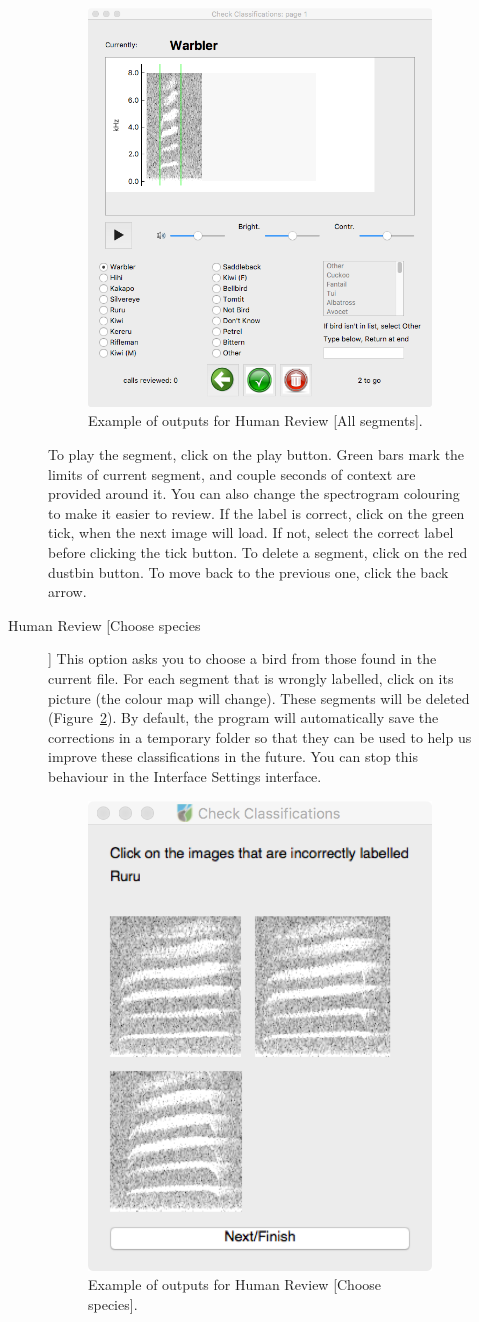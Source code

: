 \documentclass{article}
\begin{document}
\begin{description}
\begin{description}
\begin{figure}
	\includegraphics[width=.6\textwidth]{Figs/review1}
	\caption{Example of outputs for Human Review [All segments].}
	\label{check1}
	\end{figure}
	To play the segment, click on the play button. Green bars mark the limits of current segment, and couple seconds of context are provided around it. You can also change the spectrogram colouring to make it easier to review. If the label is correct, click on the green tick, when the next image will load. If not, select the correct label before clicking the tick button. To delete a segment, click on the red dustbin button. To move back to the previous one, click the back arrow. 
	\item [Human Review [Choose species]] This option asks you to choose a bird from those found in the current file. For each segment that is wrongly labelled, click on its picture (the colour map will change). These segments will be deleted (Figure~\ref{check2}). By default, the program will automatically save the corrections in a temporary folder so that they can be used to help us improve these classifications in the future. You can stop this behaviour in the Interface Settings interface.
	\begin{figure}
	\centering
	\includegraphics[width=.4\textwidth]{Figs/Check2}
	\caption{Example of outputs for Human Review [Choose species].}
	\label{check2}
	\end{figure}
	\end{description}


\end{description}
\end{document}

